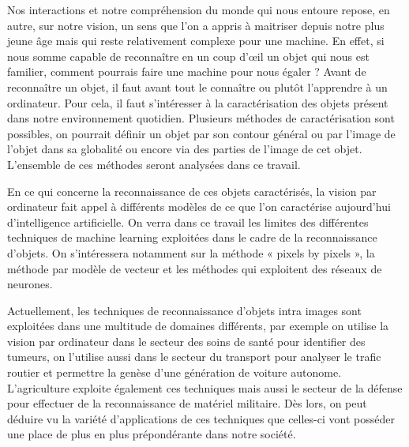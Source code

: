 \documentclass[a4paper,12pt]{article} %
\begin{document}
	Nos interactions et notre compréhension du monde qui nous entoure repose, en autre, sur notre vision, un sens que l’on a appris à maitriser depuis notre plus jeune âge mais qui reste relativement complexe pour une machine. En effet, si nous somme capable de reconnaître en un coup d’œil un objet qui nous est familier, comment pourrais faire une machine pour nous égaler ? 
Avant de reconnaître un objet, il faut avant tout le connaître ou plutôt l’apprendre à un ordinateur. Pour cela, il faut s’intéresser à la caractérisation des objets présent dans notre environnement quotidien.  Plusieurs méthodes de caractérisation sont possibles, on pourrait définir un objet par son contour général ou par l’image de l’objet dans sa globalité ou encore via des parties de l’image de cet objet. L’ensemble de ces méthodes seront analysées dans ce travail. \newline

	En ce qui concerne la reconnaissance de ces objets caractérisés, la vision par ordinateur fait appel à différents modèles de ce que l’on caractérise aujourd’hui d’intelligence artificielle. On verra dans ce travail les limites des différentes techniques de machine learning exploitées dans le cadre de la reconnaissance d’objets. On s’intéressera notamment sur la méthode « pixels by pixels », la méthode par modèle de vecteur et les méthodes qui exploitent des réseaux de neurones.\newline

	Actuellement, les techniques de reconnaissance d’objets intra images sont exploitées dans une multitude de domaines différents, par exemple on utilise la vision par ordinateur dans le secteur des soins de santé pour identifier des tumeurs, on l’utilise aussi dans le secteur du transport pour analyser le trafic routier et permettre la genèse d’une génération de voiture autonome. L’agriculture exploite également ces techniques mais aussi le secteur de la défense pour effectuer de la reconnaissance de matériel militaire. Dès lors, on peut déduire vu la variété d’applications de ces techniques que celles-ci vont posséder une place de plus en plus prépondérante dans notre société.\newline
\newpage
\end{document}

